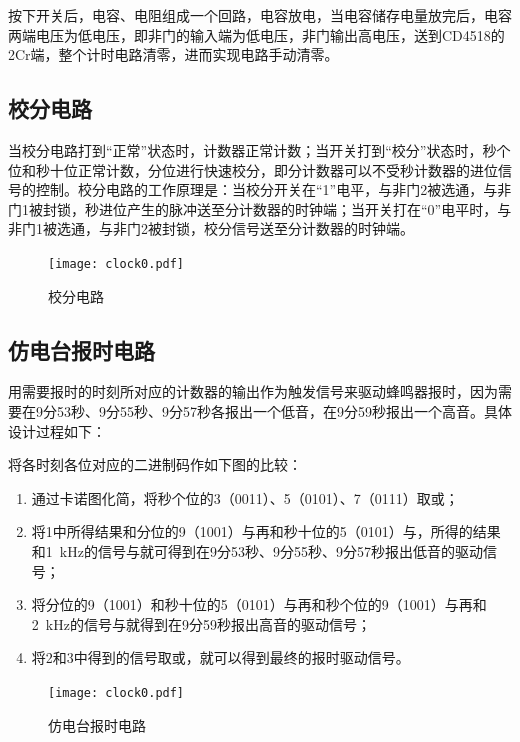 \documentclass{article}
\newcounter{sub}
\begin{document}
按下开关后，电容、电阻组成一个回路，电容放电，当电容储存电量放完后，电容两端电压为低电压，即非门的输入端为低电压，非门输出高电压，送到CD4518的2Cr端，整个计时电路清零，进而实现电路手动清零。

\subsection{校分电路}%
\label{sub:校分电路}

当校分电路打到“正常”状态时，计数器正常计数；当开关打到“校分”状态时，秒个位和秒十位正常计数，分位进行快速校分，即分计数器可以不受秒计数器的进位信号的控制。校分电路的工作原理是：当校分开关在“1”电平，与非门2被选通，与非门1被封锁，秒进位产生的脉冲送至分计数器的时钟端；当开关打在“0”电平时，与非门1被选通，与非门2被封锁，校分信号送至分计数器的时钟端。

\begin{figure}[htpb]
	\centering
	\texttt{[image: clock0.pdf]}
	\caption{校分电路}
	\label{fig:校分电路}
\end{figure}

\subsection{仿电台报时电路}%
\label{sub:仿电台报时电路}

用需要报时的时刻所对应的计数器的输出作为触发信号来驱动蜂鸣器报时，因为需要在9分53秒、9分55秒、9分57秒各报出一个低音，在9分59秒报出一个高音。具体设计过程如下：\cite{technology}

将各时刻各位对应的二进制码作如下图的比较：

\begin{enumerate}
	\item 通过卡诺图化简，将秒个位的3（0011）、5（0101）、7（0111）取或；
	\item 将1中所得结果和分位的9（1001）与再和秒十位的5（0101）与，所得的结果和\SI{1}{kHz}的信号与就可得到在9分53秒、9分55秒、9分57秒报出低音的驱动信号；
	\item 将分位的9（1001）和秒十位的5（0101）与再和秒个位的9（1001）与再和\SI{2}{kHz}的信号与就得到在9分59秒报出高音的驱动信号；
	\item 将2和3中得到的信号取或，就可以得到最终的报时驱动信号。
\end{enumerate}

\begin{figure}[htpb]
	\centering
	\texttt{[image: clock0.pdf]}
	\caption{仿电台报时电路}
	\label{fig:仿电台报时电路}
\end{figure}
\end{document}
